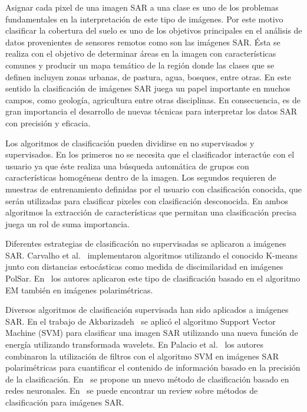 \documentclass[11pt]{article}
\begin{document}

Asignar cada pixel de una imagen SAR a una clase es uno de los problemas fundamentales en la interpretación de este tipo de imágenes. Por este motivo clasificar la cobertura del suelo es uno de los objetivos principales en el análisis de datos provenientes de sensores remotos como son las imágenes SAR. Ésta se realiza con el objetivo de determinar áreas en la imagen con características comunes  y producir un mapa temático de la región donde las clases que se definen incluyen zonas urbanas, de pastura, agua, bosques, entre otras. En este sentido la clasificación de imágenes SAR juega un papel importante en muchos campos, como geología, agricultura entre otras disciplinas. En consecuencia, es de gran importancia el desarrollo de nuevas técnicas para interpretar los datos SAR con precisión y eficacia.

Los algoritmos de clasificación pueden dividirse en no supervisados y supervisados. En los primeros no se necesita que el clasificador interactúe con el usuario ya que éste realiza una búsqueda automática de grupos con características homogéneas dentro de la imagen. Los segundos requieren de muestras de entrenamiento definidas por el usuario con clasificación conocida, que serán utilizadas para clasificar pixeles con clasificación desconocida. En ambos algoritmos la extracción de características que permitan una clasificación precisa juega un rol de suma importancia.

Diferentes estrategias de clasificación no supervisadas se aplicaron a imágenes SAR. Carvalho et al.~\cite{Carvalho2019} implementaron algoritmos utilizando el conocido K-means junto con distancias estocásticas como medida de discimilaridad en imágenes PolSar. En~\cite{Fernandez2017} los autores aplicaron este tipo de clasificación basado en el algoritmo EM también en imágenes polarimétricas. 

Diversos algoritmos de clasificación supervisada han sido aplicados a imágenes SAR. En el trabajo de Akbarizadeh~\cite{Akbarizadeh2012} se aplicó el algoritmo Support Vector Machine (SVM) para clasificar una imagen SAR utilizando una nueva función de energía utilizando transformada wavelets. En Palacio et al.~\cite{Palacio2019} los autores combinaron la utilización de filtros con el algoritmo SVM en imágenes SAR polarimétricas para cuantificar el contenido de información basado en la precisión de la clasificación. En~\cite{Zhang2019} se propone un nuevo método de clasificación basado en redes neuronales. En~\cite{Parikh2020} se puede encontrar un review sobre métodos de clasificación para imágenes SAR.
\end{document}

